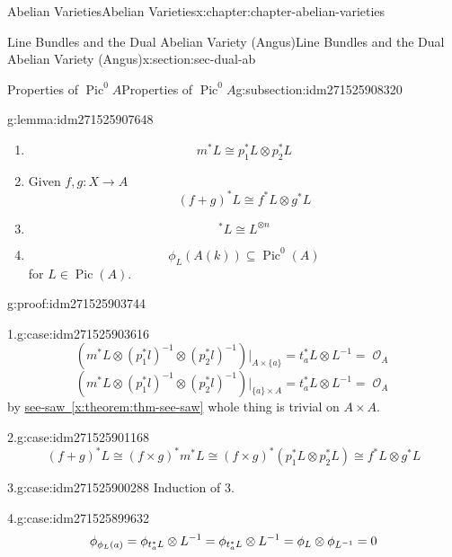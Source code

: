 \documentclass[oneside,10pt,]{book}
\newcommand{\qedhere}{\relax}
\numberwithin{equation}{section}
\newcommand{\sheaf}[1]{\operatorname{\mathcal{#1}}}
\DeclareMathOperator{\Pic}{Pic}
\begin{document}
\begin{chapterptx}{Abelian Varieties}{}{Abelian Varieties}{}{}{x:chapter:chapter-abelian-varieties}
\begin{sectionptx}{Line Bundles and the Dual Abelian Variety (Angus)}{}{Line Bundles and the Dual Abelian Variety (Angus)}{}{}{x:section:sec-dual-ab}
\begin{subsectionptx}{Properties of \(\Pic^0 A\)}{}{Properties of \(\Pic^0 A\)}{}{}{g:subsection:idm271525908320}
\begin{lemma}{}{}{g:lemma:idm271525907648}
\begin{enumerate}
\item{}%
\begin{equation*}
m^* L \cong p_1^* L\otimes p_2^* L
\end{equation*}
%
\item{}Given \(f,g \colon X \to A\)%
\begin{equation*}
(f+g)^* L \cong f^* L \otimes g^* L
\end{equation*}
%
\item{}%
\begin{equation*}
[n]^* L \cong L^{\otimes n}
\end{equation*}
%
\item{}%
\begin{equation*}
\phi_L(A(k)) \subseteq \Pic^0(A)
\end{equation*}
for \(L \in \Pic (A)\).%
\end{enumerate}
%
\end{lemma}
\begin{proofptx}{}{g:proof:idm271525903744}
\begin{case}{}{1.}{g:case:idm271525903616}
%
\begin{equation*}
(m^*L\otimes (p_1^*l)^{-1} \otimes (p_2^*l)^{-1})|_{A\times\{a\}} = t_a^*L \otimes L^{-1} = \sheaf O_A
\end{equation*}
%
\begin{equation*}
(m^*L\otimes (p_1^*l)^{-1} \otimes (p_2^*l)^{-1})|_{\{a\}\times A} = t_a^*L \otimes L^{-1} = \sheaf O_A
\end{equation*}
by \hyperref[x:theorem:thm-see-saw]{see-saw~\ref{x:theorem:thm-see-saw}} whole thing is trivial on \(A\times A\).%
\end{case}
\begin{case}{}{2.}{g:case:idm271525901168}
%
\begin{equation*}
(f+g)^*L\cong (f\times g)^* m^*L \cong (f\times g)^*(p_1^*L \otimes p_2^*L) \cong f^*L \otimes g^*L
\end{equation*}
%
\end{case}
\begin{case}{}{3.}{g:case:idm271525900288}
Induction of 3.%
\end{case}
\begin{case}{}{4.}{g:case:idm271525899632}
%
\begin{equation*}
\phi_{\phi_L(a)} = \phi_{t^*_a L}\otimes L^{-1} = \phi _{t_a^*L}\otimes L^{-1} = \phi_L \otimes \phi_{L^{-1}} = 0\qedhere
\end{equation*}
%
\end{case}

\end{proofptx}
\end{subsectionptx}
\end{sectionptx}
\end{chapterptx}
\end{document}
